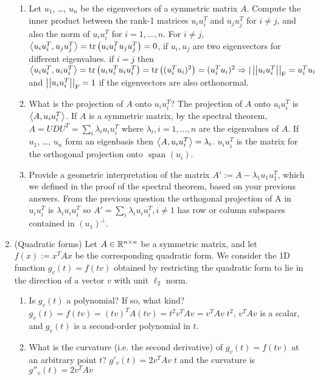 \documentclass[12pt,twoside]{article}
\begin{document}
\begin{enumerate}
\begin{enumerate}
\item Let $u_1$, \ldots, $u_n$ be the eigenvectors of a symmetric matrix $A$. Compute the inner product between the rank-1 matrices $u_iu_i^T$ and $u_ju_j^T$ for $i \neq j$, and also the norm of $u_iu_i^T$ for $i=1,\ldots,n$. 
For $i \neq j$, $\left \langle u_iu_i^T, u_ju_j^T\right \rangle = \operatorname{tr}\left( u_iu_i^Tu_ju_j^T \right) = 0$, if $u_i, u_j$ are two eigenvectors for different eigenvalues.
if $i=j$ then  $\left \langle u_iu_i^T, u_iu_i^T\right \rangle = \operatorname{tr}\left( u_iu_i^Tu_iu_i^T \right) = \operatorname{tr}\left( (u_i^Tu_i)^2 \right) = (u_i^Tu_i)^2 \Rightarrow |\left|\left| u_i u_i^T \right|\right| _{\operatorname{F}} =  u_i^Tu_i$ and $\left|\left| u_iu_i^T \right|\right| _{\operatorname{F}}=1$ if the eigenvectors are also orthonormal.
\item What is the projection of $A$ onto $u_iu_i^T$?
The projection of $A$ onto $u_iu_i^T$ is $\left \langle A, u_iu_i^T\right \rangle$. If $A$ is a symmetric matrix, by the spectral theorem, $A=U D U^T= \sum_i \lambda_i u_i u_i^T$ where $\lambda_i, i=1, \ldots,n$ are the eigenvalues of $A$. If $u_1$, \ldots, $u_n$ form an eigenbasis then $\left \langle A, u_iu_i^T\right \rangle = \lambda_i$. $u_iu_i^T$ is the matrix for the orthogonal projection
onto $\text{ span }(u_i)$.

\item Provide a geometric interpretation of the matrix $A':=A-\lambda_1 u_1u_1^T$, which we defined in the proof of the spectral theorem, based on your previous answers.
From the previous question the orthogonal projection of A in $u_iu_i^T$ is $\lambda_i u_iu_i^T$ so $A' = \sum_i \lambda_i u_iu_i^T, i \neq 1$ has row or column subspaces contained in  $(u_1)^\bot$.

\end{enumerate}

\item (Quadratic forms) Let $A\in \mathbb{R}^{n \times n}$ be a symmetric matrix, and let $f(x):=x^TAx$ be the corresponding quadratic form. We consider the 1D function $g_{v}(t)=f(tv)$ obtained by restricting the quadratic form to lie in the direction of a vector $v$ with unit $\ell_2$ norm.
\begin{enumerate}
\item Is $g_{v}(t)$ a polynomial? If so, what kind?
	$g_{v}(t) = f(tv) = (tv)^T A (tv) = t^2 v^T A v = v^T A v \; t^2$, $v^T A v$ is a scalar, and $g_{v}(t)$ is a second-order polynomial in $t$. 
\item What is the curvature (i.e. the second derivative) of $g_{v}(t)=f(tv)$ at an arbitrary point $t$?
$g'_{v}(t)= 2 v^T A v \; t$ and the curvature is $g''_{v}(t)= 2 v^T A v$


\end{enumerate}
\end{enumerate}
\end{document}
